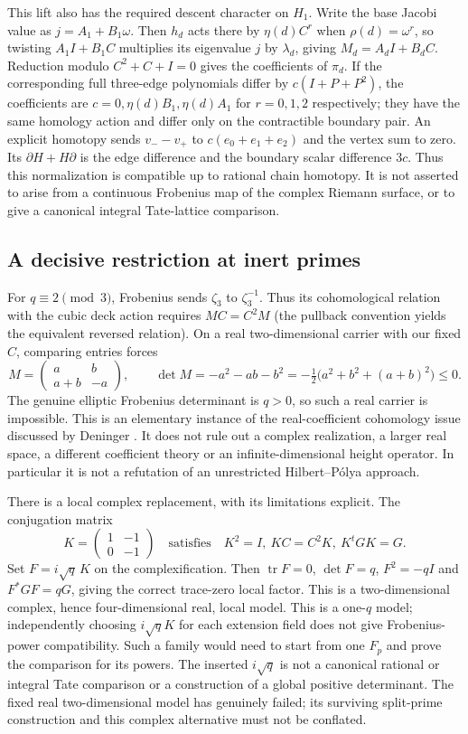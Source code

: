 \documentclass[11pt]{article}
\theoremstyle{definition}\newtheorem{definition}[theorem]{Definition}
\theoremstyle{remark}\newtheorem{remark}[theorem]{Remark}
\DeclareMathOperator{\tr}{tr}\DeclareMathOperator{\Rea}{Re}
\begin{document}
This lift also has the required descent character on $H_1$. Write the base Jacobi value as $j=A_1+B_1\omega$. Then $h_d$ acts there by $\eta(d)C^r$ when $\rho(d)=\omega^r$, so twisting $A_1I+B_1C$ multiplies its eigenvalue $j$ by $\lambda_d$, giving $M_d=A_dI+B_dC$. Reduction modulo $C^2+C+I=0$ gives the coefficients of $\pi_d$. If the corresponding full three-edge polynomials differ by $c(I+P+P^2)$, the coefficients are $c=0,\eta(d)B_1,\eta(d)A_1$ for $r=0,1,2$ respectively; they have the same homology action and differ only on the contractible boundary pair. An explicit homotopy sends $v_--v_+$ to $c(e_0+e_1+e_2)$ and the vertex sum to zero. Its $\partial H+H\partial$ is the edge difference and the boundary scalar difference $3c$. Thus this normalization is compatible up to rational chain homotopy. It is not asserted to arise from a continuous Frobenius map of the complex Riemann surface, or to give a canonical integral Tate-lattice comparison.

\subsection{A decisive restriction at inert primes}
For $q\equiv2\pmod3$, Frobenius sends $\zeta_3$ to $\zeta_3^{-1}$. Thus its cohomological relation with the cubic deck action requires $MC=C^2M$ (the pullback convention yields the equivalent reversed relation). On a real two-dimensional carrier with our fixed $C$, comparing entries forces
\[
 M=\begin{pmatrix}a&b\\a+b&-a\end{pmatrix},\qquad
 \det M=-a^2-ab-b^2
 =-\tfrac12\bigl(a^2+b^2+(a+b)^2\bigr)\le0.
\]
The genuine elliptic Frobenius determinant is $q>0$, so such a real carrier is impossible. This is an elementary instance of the real-coefficient cohomology issue discussed by Deninger \cite{DeningerReal}. It does not rule out a complex realization, a larger real space, a different coefficient theory or an infinite-dimensional height operator. In particular it is not a refutation of an unrestricted Hilbert--P\'olya approach.

There is a local complex replacement, with its limitations explicit. The conjugation matrix
\[
 K=\begin{pmatrix}1&-1\\0&-1\end{pmatrix}
 \quad\text{satisfies}\quad K^2=I,\ KC=C^2K,\ K^tGK=G.
\]
Set $F=i\sqrt q\,K$ on the complexification. Then $\tr F=0$, $\det F=q$, $F^2=-qI$ and $F^*GF=qG$, giving the correct trace-zero local factor. This is a two-dimensional complex, hence four-dimensional real, local model. This is a one-$q$ model; independently choosing $i\sqrt q K$ for each extension field does not give Frobenius-power compatibility. Such a family would need to start from one $F_p$ and prove the comparison for its powers. The inserted $i\sqrt q$ is not a canonical rational or integral Tate comparison or a construction of a global positive determinant. The fixed real two-dimensional model has genuinely failed; its surviving split-prime construction and this complex alternative must not be conflated.
\end{document}

